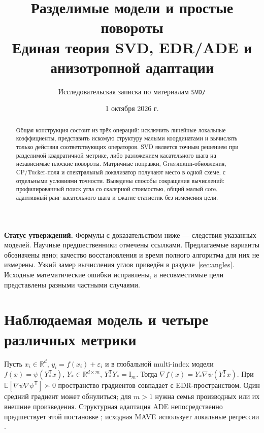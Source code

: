 \documentclass[11pt,a4paper]{article}
\title{Разделимые модели и простые повороты\\[3pt]
\large Единая теория SVD, EDR/ADE и анизотропной адаптации}
\author{Исследовательская записка по материалам \texttt{SVD/}}
\date{1 октября 2026 г.}
\newcommand{\R}{\mathbb R}
\newcommand{\Id}{\mathrm I}
\newcommand{\T}{^{\mathsf T}}
\begin{document}
\maketitle
\vspace{-8mm}
\begin{abstract}
Общая конструкция состоит из трёх операций: исключить линейные локальные
коэффициенты, представить искомую структуру малыми координатами и вычислять
только действия соответствующих операторов. SVD является точным решением
при разделимой квадратичной метрике, либо разложением касательного шага на
независимые плоские повороты. Матричные поправки, Grassmann-обновления,
CP/Tucker-поля и спектральный локализатор получают место в одной схеме,
с отдельными условиями точности. Выведены способы сокращения вычислений:
профилированный поиск угла со скалярной стоимостью, общий малый core,
адаптивный ранг касательного шага и сжатие статистик без изменения цели.
\end{abstract}
\vspace{-3mm}
\tableofcontents
\medskip
\textbf{Статус утверждений.} Формулы с доказательством ниже --- следствия
указанных моделей. Научные предшественники отмечены ссылками.
Предлагаемые варианты обозначены явно; качество восстановления и время
полного алгоритма для них не измерены. Узкий замер вычисления углов
приведён в разделе~\ref{sec:angles}. Исходные математические ошибки
исправлены, а несовместимые цели представлены разными частными случаями.

\section{Наблюдаемая модель и четыре различных метрики}\label{sec:model}

Пусть $x_i\in\R^d$, $y_i=f(x_i)+\varepsilon_i$ и в глобальной
multi-index модели $f(x)=\psi(Y_*\T x)$,
$Y_*\in\R^{d\times m}$, $Y_*\T Y_*=\Id_m$.
Тогда $\nabla f(x)=Y_*\nabla\psi(Y_*\T x)$.
При $\mathbb E[\nabla\psi\nabla\psi\T]\succ0$ пространство градиентов
совпадает с EDR-пространством. Один средний градиент может обнулиться;
для $m>1$ нужна семья производных или их внешние произведения.
Структурная адаптация ADE непосредственно предшествует этой постановке
\cite{hjps}; исходная MAVE использует локальные регрессии \cite{mave}.
\end{document}
